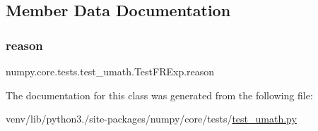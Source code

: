 \subsection{Member Data Documentation}
\mbox{\label{classnumpy_1_1core_1_1tests_1_1test__umath_1_1TestFRExp_a766d376201ea79b163d84ee8f3152e67}} 
\subsubsection{\texorpdfstring{reason}{reason}}
{\footnotesize\ttfamily numpy.\+core.\+tests.\+test\+\_\+umath.\+Test\+F\+R\+Exp.\+reason\hspace{0.3cm}{\ttfamily [static]}}



The documentation for this class was generated from the following file\+:\begin{DoxyCompactItemize}
\item 
venv/lib/python3./site-\/packages/numpy/core/tests/\hyperlink{test__umath_8py}{test\+\_\+umath.\+py}\end{DoxyCompactItemize}
